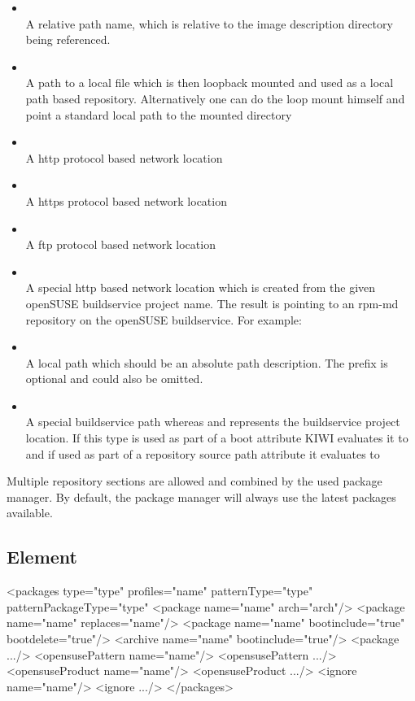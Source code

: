 \begin{itemize}
\item {}\\
      A relative path name, which is relative to the image
      description directory being referenced.
\item {}\\
      A path to a local  file which is then loopback mounted
      and used as a local path based repository. Alternatively one
      can do the loop mount himself and point a standard local path
      to the mounted directory
\item {}\\
      A http protocol based network location
\item {}\\
      A https protocol based network location
\item {}\\
      A ftp protocol based network location
\item {}\\
      A special http based network location which is created from
      the given openSUSE buildservice project name. The result is
      pointing to an rpm-md repository on the openSUSE buildservice.
      For example: %
\item {}\\
      A local path which should be an absolute path description.
      The  prefix is optional and could also be omitted.
\item {}\\
      A special buildservice path whereas  and 
      represents the buildservice project location. If this type is
      used as part of a boot attribute KIWI evaluates it to
       and if used as part of a repository
      source path attribute it evaluates to 
\end{itemize}

Multiple repository sections are allowed and combined by the
used package manager. By default, the package manager will always use
the latest packages available.

\subsection{ Element}
\begin{xml}
<packages type="type" profiles="name" patternType="type" patternPackageType="type"
  <package name="name" arch="arch"/>
  <package name="name" replaces="name"/>
  <package name="name" bootinclude="true" bootdelete="true"/>
  <archive name="name" bootinclude="true"/>
  <package .../>
  <opensusePattern name="name"/>
  <opensusePattern .../>
  <opensuseProduct name="name"/>
  <opensuseProduct .../>
  <ignore name="name"/>
  <ignore .../>
</packages>
\end{xml}

